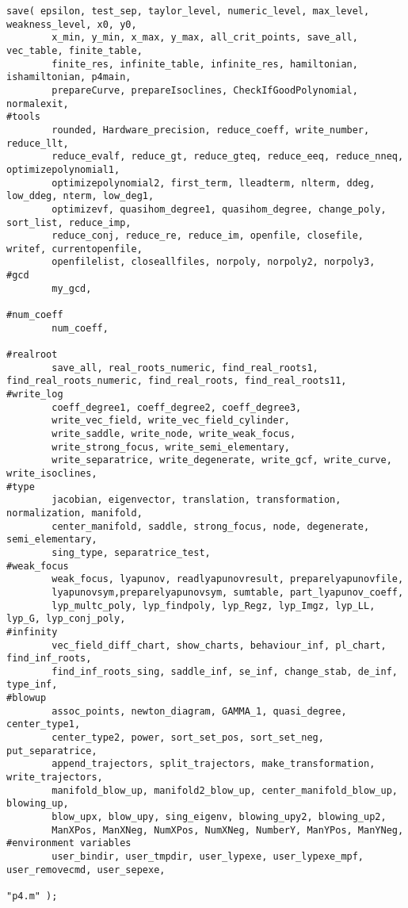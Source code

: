 \documentclass[a4paper,10pt]{article}
\begin{document}
\begin{lstlisting}[name=main]
save( epsilon, test_sep, taylor_level, numeric_level, max_level, weakness_level, x0, y0,
        x_min, y_min, x_max, y_max, all_crit_points, save_all, vec_table, finite_table,
        finite_res, infinite_table, infinite_res, hamiltonian, ishamiltonian, p4main,
        prepareCurve, prepareIsoclines, CheckIfGoodPolynomial, normalexit,
#tools
        rounded, Hardware_precision, reduce_coeff, write_number, reduce_llt,
        reduce_evalf, reduce_gt, reduce_gteq, reduce_eeq, reduce_nneq, optimizepolynomial1, 
        optimizepolynomial2, first_term, lleadterm, nlterm, ddeg, low_ddeg, nterm, low_deg1, 
        optimizevf, quasihom_degree1, quasihom_degree, change_poly, sort_list, reduce_imp, 
        reduce_conj, reduce_re, reduce_im, openfile, closefile, writef, currentopenfile, 
        openfilelist, closeallfiles, norpoly, norpoly2, norpoly3,
#gcd
        my_gcd,

#num_coeff
        num_coeff,

#realroot
        save_all, real_roots_numeric, find_real_roots1, find_real_roots_numeric, find_real_roots, find_real_roots11,
#write_log
        coeff_degree1, coeff_degree2, coeff_degree3,
        write_vec_field, write_vec_field_cylinder,
        write_saddle, write_node, write_weak_focus,
        write_strong_focus, write_semi_elementary,
        write_separatrice, write_degenerate, write_gcf, write_curve, write_isoclines,
#type
        jacobian, eigenvector, translation, transformation, normalization, manifold,
        center_manifold, saddle, strong_focus, node, degenerate, semi_elementary,
        sing_type, separatrice_test,
#weak_focus
        weak_focus, lyapunov, readlyapunovresult, preparelyapunovfile,
        lyapunovsym,preparelyapunovsym, sumtable, part_lyapunov_coeff,
        lyp_multc_poly, lyp_findpoly, lyp_Regz, lyp_Imgz, lyp_LL, lyp_G, lyp_conj_poly,
#infinity
        vec_field_diff_chart, show_charts, behaviour_inf, pl_chart, find_inf_roots, 
        find_inf_roots_sing, saddle_inf, se_inf, change_stab, de_inf, type_inf,
#blowup
        assoc_points, newton_diagram, GAMMA_1, quasi_degree, center_type1,
        center_type2, power, sort_set_pos, sort_set_neg, put_separatrice,
        append_trajectors, split_trajectors, make_transformation, write_trajectors,
        manifold_blow_up, manifold2_blow_up, center_manifold_blow_up, blowing_up,
        blow_upx, blow_upy, sing_eigenv, blowing_upy2, blowing_up2,
        ManXPos, ManXNeg, NumXPos, NumXNeg, NumberY, ManYPos, ManYNeg,
#environment variables
        user_bindir, user_tmpdir, user_lypexe, user_lypexe_mpf, user_removecmd, user_sepexe,

"p4.m" );
\end{lstlisting}
\end{document}
